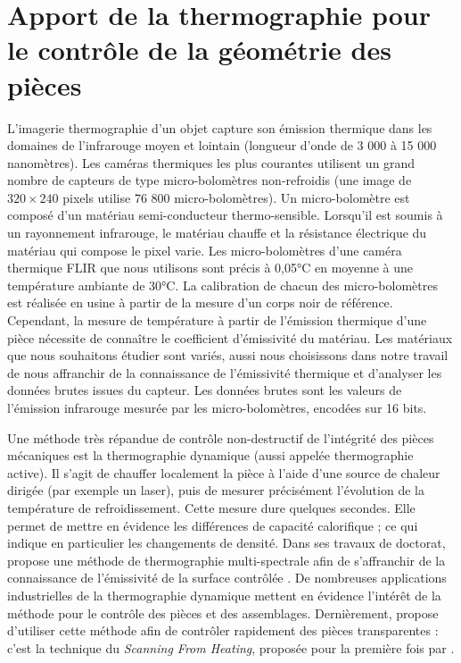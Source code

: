 \newpage
\section{Apport de la thermographie pour le contrôle de la géométrie des pièces} \label{subsec:thermography}
L'imagerie thermographie d'un objet capture son émission thermique dans les domaines de l'infrarouge moyen et lointain (longueur d'onde de 3 000 à 15 000 nanomètres).
Les caméras thermiques les plus courantes utilisent un grand nombre de capteurs de type micro-bolomètres non-refroidis (une image de $320\times 240$ pixels utilise 76 800 micro-bolomètres).
Un micro-bolomètre est composé d'un matériau semi-conducteur thermo-sensible.
Lorsqu'il est soumis à un rayonnement infrarouge, le matériau chauffe et la résistance électrique du matériau qui compose le pixel varie.  %
Les micro-bolomètres d'une caméra thermique FLIR que nous utilisons sont précis à 0,05°C en moyenne à une température ambiante de 30°C.
La calibration de chacun des micro-bolomètres est réalisée en usine à partir de la mesure d'un corps noir de référence.
Cependant, la mesure de température à partir de l'émission thermique d'une pièce nécessite de connaître le coefficient d'émissivité du matériau.
Les matériaux que nous souhaitons étudier sont variés, aussi nous choisissons dans notre travail de nous affranchir de la connaissance de l'émissivité thermique et d'analyser les données brutes issues du capteur.
Les données brutes sont les valeurs de l'émission infrarouge mesurée par les micro-bolomètres, encodées sur 16 bits.

Une méthode très répandue de contrôle non-destructif de l'intégrité des pièces mécaniques est la thermographie dynamique (aussi appelée thermographie active).
Il s'agit de chauffer localement la pièce à l'aide d'une source de chaleur dirigée (par exemple un laser), puis de mesurer précisément l'évolution de la température de refroidissement.
Cette mesure dure quelques secondes.
Elle permet de mettre en évidence les différences de capacité calorifique ; ce qui indique en particulier les changements de densité.  %
Dans ses travaux de doctorat, \citeauthor{legrand_thermographie_2002} propose une méthode de thermographie multi-spectrale afin de s'affranchir de la connaissance de l'émissivité de la surface contrôlée \cite{legrand_thermographie_2002}.
De nombreuses applications industrielles de la thermographie dynamique mettent en évidence l'intérêt de la méthode pour le contrôle des pièces et des assemblages.
Dernièrement, \citeauthor{herrmann_cracks_2019} propose d'utiliser cette méthode afin de contrôler rapidement des pièces transparentes \cite{herrmann_cracks_2019} : c'est la technique du \textit{Scanning From Heating}, proposée pour la première fois par \citeauthor{eren_scanning_2009} \cite{eren_scanning_2009} .

